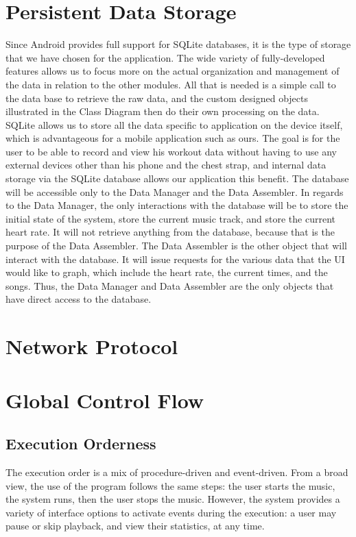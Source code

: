\documentclass[letterpaper,english, 12pt]{scrreprt}
\begin{document}
\section{Persistent Data Storage}
Since Android provides full support for SQLite databases, it is the type of storage that we have chosen for the application. The wide variety of fully-developed features allows us to focus more on the actual organization and management of the data in relation to the other modules. All that is needed is a simple call to the data base to retrieve the raw data, and the custom designed objects illustrated in the Class Diagram then do their own processing on the data. SQLite allows us to store all the data specific to application on the device itself, which is advantageous for a mobile application such as ours. The goal is for the user to be able to record and view his workout data without having to use any external devices other than his phone and the chest strap, and internal data storage via the SQLite database allows our application this benefit.
	The database will be accessible only to the Data Manager and the Data Assembler. In regards to the Data Manager, the only interactions with the database will be to store the initial state of the system, store the current music track, and store the current heart rate. It will not retrieve anything from the database, because that is the purpose of the Data Assembler. The Data Assembler is the other object that will interact with the database. It will issue requests for the various data that the UI would like to graph, which include the heart rate, the current times, and the songs. Thus, the Data Manager and Data Assembler are the only objects that have direct access to the database.
\section{Network Protocol}

\section{Global Control Flow}
\subsection{Execution Orderness}
The execution order is a mix of procedure-driven and event-driven.
From a broad view, the use of the program follows the same steps: the user starts the music, the system runs, then the user stops the music.
However, the system provides a variety of interface options to activate events during the execution: a user may pause or skip playback, and view their statistics, at any time.
\end{document}
